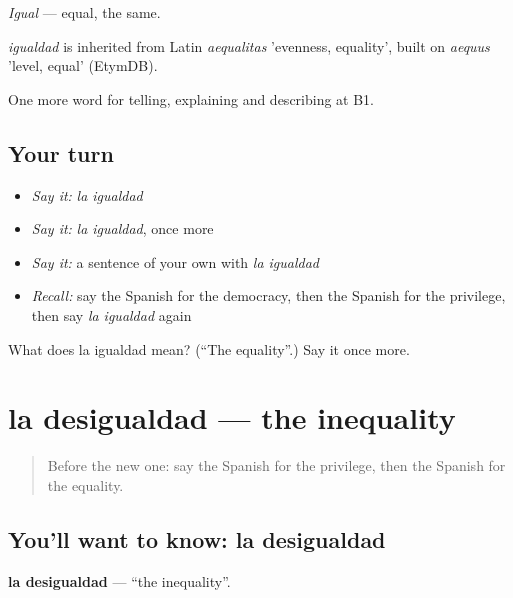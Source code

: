 \emph{Igual} — equal, the same.

\begin{cousinweb}
\emph{igualdad} is inherited from Latin \emph{aequalitas} 'evenness, equality', built on \emph{aequus} 'level, equal' (EtymDB).
\end{cousinweb}

\begin{grammarlens}[title={What you've built}]
One more word for telling, explaining and describing at B1.
\end{grammarlens}

\subsection*{Your turn}
\begin{itemize}
\raggedright
  \item \emph{Say it:} \emph{la igualdad}
  \item \emph{Say it:} \emph{la igualdad}, once more
  \item \emph{Say it:} a sentence of your own with \emph{la igualdad}
  \item \emph{Recall:} say the Spanish for the democracy, then the Spanish for the privilege, then say \emph{la igualdad} again
\end{itemize}

\begin{tcolorbox}[breakable,colback=teal!4,colframe=teal!35!black,title={Before you move on}]
What does la igualdad mean? (\textquotedblleft{}The equality\textquotedblright{}.) Say it once more.
\end{tcolorbox}
\section[la desigualdad]{la desigualdad — the inequality}

\label{lesson:ES-C603-desigualdad}



\begin{quote}
Before the new one: say the Spanish for the privilege, then the Spanish for the equality.
\end{quote}

\subsection*{You'll want to know: la desigualdad}
\textbf{la desigualdad} — \textquotedblleft{}the inequality\textquotedblright{}.

